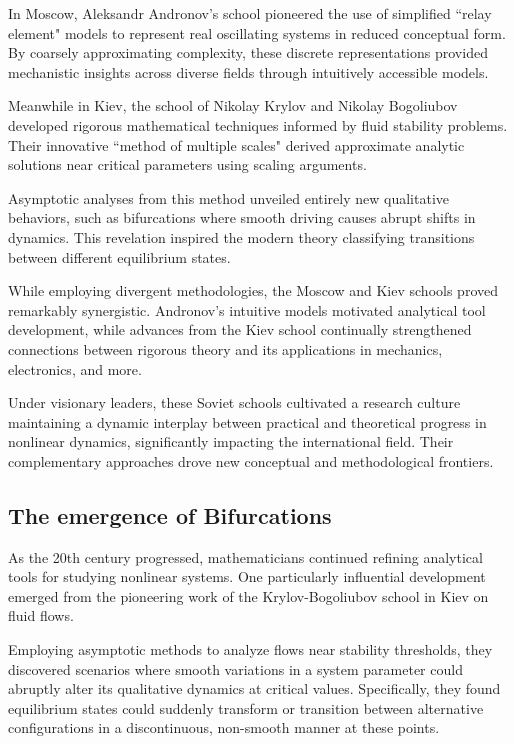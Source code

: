 In Moscow, Aleksandr Andronov's school pioneered the use of simplified ``relay element" models to represent real oscillating systems in reduced conceptual form. By coarsely approximating complexity, these discrete representations provided mechanistic insights across diverse fields through intuitively accessible models.

Meanwhile in Kiev, the school of Nikolay Krylov and Nikolay Bogoliubov developed rigorous mathematical techniques informed by fluid stability problems. Their innovative ``method of multiple scales" derived approximate analytic solutions near critical parameters using scaling arguments.

Asymptotic analyses from this method unveiled entirely new qualitative behaviors, such as bifurcations where smooth driving causes abrupt shifts in dynamics. This revelation inspired the modern theory classifying transitions between different equilibrium states.

While employing divergent methodologies, the Moscow and Kiev schools proved remarkably synergistic. Andronov's intuitive models motivated analytical tool development, while advances from the Kiev school continually strengthened connections between rigorous theory and its applications in mechanics, electronics, and more.

Under visionary leaders, these Soviet schools cultivated a research culture maintaining a dynamic interplay between practical and theoretical progress in nonlinear dynamics, significantly impacting the international field. Their complementary approaches drove new conceptual and methodological frontiers.

\subsection{The emergence of Bifurcations}

As the 20th century progressed, mathematicians continued refining analytical tools for studying nonlinear systems. One particularly influential development emerged from the pioneering work of the Krylov-Bogoliubov school in Kiev on fluid flows.

Employing asymptotic methods to analyze flows near stability thresholds, they discovered scenarios where smooth variations in a system parameter could abruptly alter its qualitative dynamics at critical values. Specifically, they found equilibrium states could suddenly transform or transition between alternative configurations in a discontinuous, non-smooth manner at these points.

